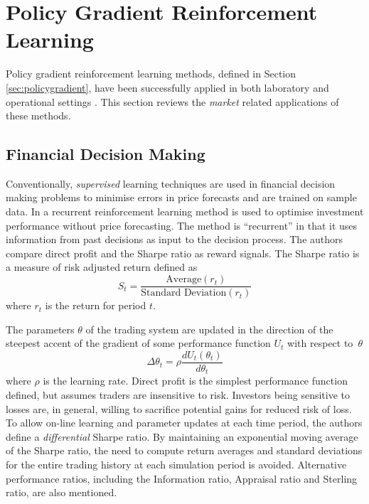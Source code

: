 \section{Policy Gradient Reinforcement Learning}
Policy gradient reinforcement learning methods, defined in Section
\ref{sec:policygradient}, have been successfully applied in both laboratory and
operational settings \cite{barto:policy,shaal:robots,peshkin:routing}.  This
section reviews the \textit{market} related applications of these methods.

\subsection{Financial Decision Making}
\label{sec:moody}
Conventionally, \textit{supervised} learning techniques are used in financial
decision making problems to minimise errors in price forecasts and are trained
on sample data.  In  a recurrent reinforcement learning
method is used to optimise investment performance without price forecasting.
The method is ``recurrent'' in that it uses information from past decisions as
input to the decision process.  The authors compare direct profit and the
Sharpe ratio \cite{sharpe:ratio66,sharpe:ratio94} as reward signals. The Sharpe ratio is a
measure of risk adjusted return defined as
\begin{equation}
S_t = \frac{\mbox{Average}(r_t)}{\mbox{Standard Deviation}(r_t)}
\end{equation}
where $r_t$ is the return for period $t$.

The parameters $\theta$ of the trading system are updated in the direction of
the steepest accent of the gradient of some performance function $U_t$ with
respect to~$\theta$
\begin{equation}
\Delta\theta_t = \rho \frac{dU_t(\theta_t)}{d\theta_t}
\end{equation}
where $\rho$ is the learning rate.  Direct profit is the simplest performance
function defined, but assumes traders are insensitive to risk.  Investors
being sensitive to losses are, in general, willing to sacrifice potential gains
for reduced risk of loss. To allow on-line learning and parameter updates at
each time period, the authors define a \textit{differential} Sharpe ratio.  By maintaining an
exponential moving average of the Sharpe ratio, the need to compute return
averages and standard deviations for the entire trading history at each
simulation period is avoided.  Alternative performance ratios, including the
Information ratio, Appraisal ratio and Sterling ratio, are also mentioned.

